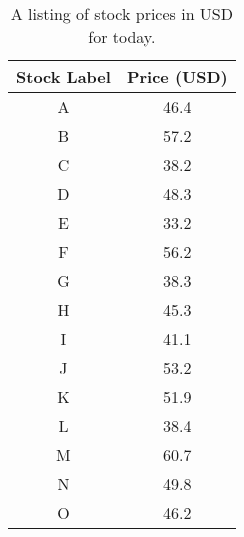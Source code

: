 \documentclass{article}
\begin{document}
\begin{table}[hb]
\centering
\begin{tabular}{| c | c |}
\hline \hline
Stock Label & Price (USD) \\ \hline
A & 46.4 \\ \hline
B & 57.2 \\ \hline
C & 38.2 \\ \hline
D & 48.3 \\ \hline
E & 33.2 \\ \hline
F & 56.2 \\ \hline
G & 38.3 \\ \hline
H & 45.3 \\ \hline
I & 41.1 \\ \hline
J & 53.2 \\ \hline
K & 51.9 \\ \hline
L & 38.4 \\ \hline
M & 60.7 \\ \hline
N & 49.8 \\ \hline
O & 46.2\\ \hline
\hline
\end{tabular}
\caption{\label{tab:scores} A listing of stock prices in USD for today.}
\end{table}
\end{document}
